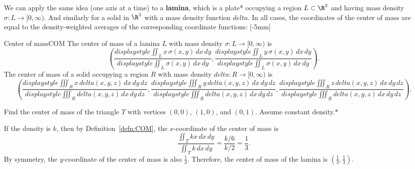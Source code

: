 \documentclass[indent]{watsonbook}
\begin{document}
{We can apply the same idea (one axis at a time) to a \textbf{lamina},
which is a plate* occupying a region $L\subset \R^2$ and having mass
density $\sigma:L \to [0,\infty)$. And similarly for a solid in $\R^3$
with a mass density function ${d}elta$. In all cases, the coordinates
of the center of mass are equal to the density-weighted averages of
the corresponding coordinate functions: [-5mm]

\begin{defn}{Center of mass}{COM}
  The {center of mass} of a lamina $L$ with mass density $\sigma:L \to [0,\infty)$ is
  \[
    \left(
      \frac{{d}isplaystyle{\iint_L x \, \sigma(x,y) \, {d} x \, {d} y}}
      {{d}isplaystyle{\iint_L \sigma(x,y) \, {d} x \, {d} y}},
      \frac{{d}isplaystyle{\iint_L y \, \sigma(x,y) \, {d} x \, {d} y}}
      {{d}isplaystyle{\iint_L \sigma(x,y) \, {d} x \, {d} y}}
    \right).
  \]
  The center of mass of a solid occupying a region $R$ with mass
  density ${d}elta:R \to [0,\infty)$ is
  \[
    \left(
      \frac{{d}isplaystyle{\iiint_R x \, {d}elta(x,y,z) \, {d} x \, {d} y \, {d} z}}
      {{d}isplaystyle{\iiint_R {d}elta(x,y,z) \, {d} x \, {d} y \, {d} z}},
      \frac{{d}isplaystyle{\iiint_R y \, {d}elta(x,y,z) \, {d} x \, {d} y \, {d} z}}
      {{d}isplaystyle{\iiint_R {d}elta(x,y,z) \, {d} x \, {d} y \, {d} z}},
      \frac{{d}isplaystyle{\iiint_R z \, {d}elta(x,y,z) \, {d} x \, {d} y \, {d} z}}
      {{d}isplaystyle{\iiint_R {d}elta(x,y,z) \, {d} x \, {d} y \, {d} z}}
    \right).
  \]
\end{defn}

\begin{example}{}{}
  Find the center of mass of the triangle $T$ with vertices $(0,0)$,
  $(1,0)$, and $(0,1)$. Assume constant density.* 
\end{example}

\begin{solution}
  If the density is $k$, then by Definition~\ref{defn:COM}, the
  $x$-coordinate of the center of mass is
  \[
    \frac{\iint_T kx \, {d} x \, {d} y}{\iint_T k \, {d} x \, {d} y}
    =\frac{k/6}{k/2} = \frac{1}{3}.
  \]
  By symmetry, the $y$-coordinate of the center of mass is also
  $\tfrac{1}{3}$. Therefore, the center of mass of the lamina is
  $\boxed{\left(\tfrac{1}{3}, \tfrac{1}{3}\right)}$.
\end{solution}

}
\end{document}
